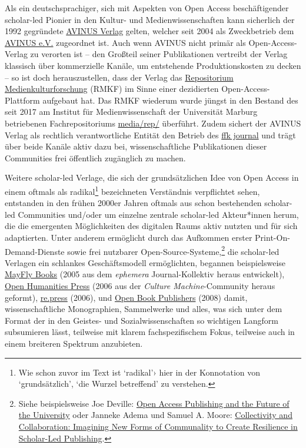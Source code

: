 \documentclass[a4paper,
fontsize=11pt,
oneside,
numbers=noperiodatend,
parskip=half-,
bibliography=totoc,
final
]{scrartcl}
\begin{document}
Als ein deutschsprachiger, sich mit Aspekten von Open Access
beschäftigender scholar-led Pionier in den Kultur- und
Medienwissenschaften kann sicherlich der 1992 gegründete
\href{https://produkte.avinus.de/avinus/ueber-den-verlag}{AVINUS Verlag}
gelten, welcher seit 2004 als Zweckbetrieb dem
\href{https://verein.avinus.org/}{AVINUS e.V.} zugeordnet ist. Auch wenn
AVINUS nicht primär als Open-Access-Verlag zu verorten ist -- den
Großteil seiner Publikationen vertreibt der Verlag klassisch über
kommerzielle Kanäle, um entstehende Produktionskosten zu decken -- so
ist doch herauszustellen, dass der Verlag das
\href{http://repositorium.medienkulturforschung.de/}{Repositorium
Medienkulturforschung} (RMKF) im Sinne einer dezidierten
Open-Access-Plattform aufgebaut hat. Das RMKF wiederum wurde jüngst in
den Bestand des seit 2017 am Institut für Medienwissenschaft der
Universität Marburg betriebenen Fachrepositoriums
\href{https://mediarep.org/}{media/rep/} überführt. Zudem sichert der
AVINUS Verlag als rechtlich verantwortliche Entität den Betrieb des
\href{http://ffk-journal.de/}{ffk journal} und trägt über beide Kanäle
aktiv dazu bei, wissenschaftliche Publikationen dieser Communities frei
öffentlich zugänglich zu machen.

Weitere scholar-led Verlage, die sich der grundsätzlichen Idee von Open
Access in einem oftmals als radikal\footnote{Wie schon zuvor im Text ist
  \enquote*{radikal}› hier in der Konnotation von
  \enquote*{grundsätzlich}, \enquote*{die Wurzel betreffend} zu
  verstehen.} bezeichneten Verständnis verpflichtet sehen, entstanden in
den frühen 2000er Jahren oftmals aus schon bestehenden scholar-led
Communities und/oder um einzelne zentrale scholar-led Akteur*innen
herum, die die emergenten Möglichkeiten des digitalen Raums aktiv
nutzten und für sich adaptierten. Unter anderem ermöglicht durch das
Aufkommen erster Print-On-Demand-Dienste sowie frei nutzbarer
Open-Source-Systeme,\footnote{Siehe beispielsweise Joe Deville:
  \href{https://www.matteringpress.org/blog/open-access-publishing-and-the-future-of-the-university}{Open
  Access Publishing and the Future of the University} oder Janneke Adema
  und Samuel A. Moore:
  \href{https://doi.org/10.1629/uksg.399}{Collectivity and
  Collaboration: Imagining New Forms of Communality to Create Resilience
  in Scholar-Led Publishing}.} die scholar-led Verlagen ein schlankes
Geschäftsmodell ermöglichten, begannen beispielsweise
\href{http://mayflybooks.org/?page_id=2}{MayFly Books} (2005 aus dem
\emph{ephemera} Journal-Kollektiv heraus entwickelt),
\href{http://www.openhumanitiespress.org/about/community/}{Open
Humanities Press} (2006 aus der \emph{Culture Machine}-Community heraus
geformt), \href{https://re-press.org/}{re.press} (2006), und
\href{https://www.openbookpublishers.com/section/14/1}{Open Book
Publishers} (2008) damit, wissenschaftliche Monographien, Sammelwerke
und alles, was sich unter dem Format der in den Geistes- und
Sozialwissenschaften so wichtigen Langform subsumieren lässt, teilweise
mit klarem fachspezifischem Fokus, teilweise auch in einem breiteren
Spektrum anzubieten.
\end{document}
